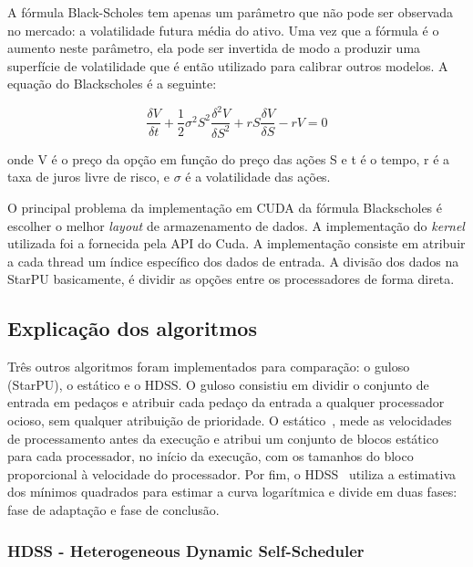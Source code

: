 A fórmula Black-Scholes tem apenas um parâmetro que não pode ser observada no mercado: a volatilidade futura média do ativo. Uma vez que a fórmula é o aumento neste parâmetro, ela pode ser invertida de modo a produzir uma superfície de volatilidade que é então utilizado para calibrar outros modelos. A equação do Blackscholes é a seguinte:

\begin{equation} \frac {\delta V}{\delta t} + \frac{1}{2} \sigma^2 S^2 \frac{\delta^2 V}{\delta S^2} + rS \frac{\delta V}{\delta S} - rV = 0
 \label{eq:black}
\end{equation}

onde V é o preço da opção em função do preço das ações S e t é o tempo, r é a taxa de juros livre de risco, e $\sigma$ é a volatilidade das ações.

O principal problema da implementação em CUDA da fórmula Blackscholes é escolher o melhor \emph{layout} de armazenamento de dados. A implementação do \emph{kernel} utilizada foi a fornecida pela API do Cuda. A implementação consiste em atribuir a cada thread um 
índice específico dos dados de entrada. A divisão dos dados na StarPU basicamente, é dividir as opções entre os processadores de forma direta. 


\subsection{Explicação dos algoritmos}

Três outros algoritmos foram implementados para comparação: o guloso (StarPU), o estático e o
HDSS. O guloso consistiu em dividir o conjunto de entrada em pedaços e atribuir 
cada pedaço da entrada a qualquer processador ocioso, sem qualquer atribuição de prioridade. O estático~\citep{raphael}, mede as velocidades de processamento antes da execução e  atribui um conjunto  de blocos estático para cada processador, no início da execução, com os
tamanhos do bloco proporcional à velocidade do processador. Por fim, o HDSS~\citep{HDSS}  
utiliza a estimativa dos mínimos quadrados para estimar a curva logarítmica e divide em duas fases: fase de adaptação e fase de conclusão. 

\subsubsection{HDSS - Heterogeneous Dynamic Self-Scheduler}

